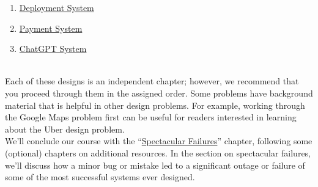 \begin{enumerate}
\protect{}\label{1P1ZiQihyUO6sT9zwfdbG}
\href{https://www.educative.io/courses/grokking-the-system-design-interview/system-design-google-docs}{Google Docs}
\item
\protect{}\label{PzJprcKDodITjBtkca7JC}
\href{https://www.educative.io/courses/grokking-the-system-design-interview/introduction-to-code-deployment-system}{Deployment System}
\item
\protect{}\label{Y34mjrQY-vN-Lze1i-mku}
\href{https://www.educative.io/courses/grokking-the-system-design-interview/introduction-to-the-payment-system}{Payment System}
\item
\protect{}\label{Z1ORHlIGNLyyJ9Kn6H4cD}
\href{https://www.educative.io/courses/grokking-the-system-design-interview/system-design-chatgpt-system}{ChatGPT System}
\end{enumerate}
\\
Each of these designs is an independent chapter; however, we recommend that you proceed through them in the assigned order. Some problems have background material that is helpful in other design problems. For example, working through the Google Maps problem first can be useful for readers interested in learning about the Uber design problem.
\\
We'll conclude our course with the ``\href{https://www.educative.io/courses/grokking-the-system-design-interview/introduction-to-distributed-system-failures}{Spectacular Failures}'' chapter, following some (optional) chapters on additional resources. In the section on spectacular failures, we'll discuss how a minor bug or mistake led to a significant outage or failure of some of the most successful systems ever designed.

